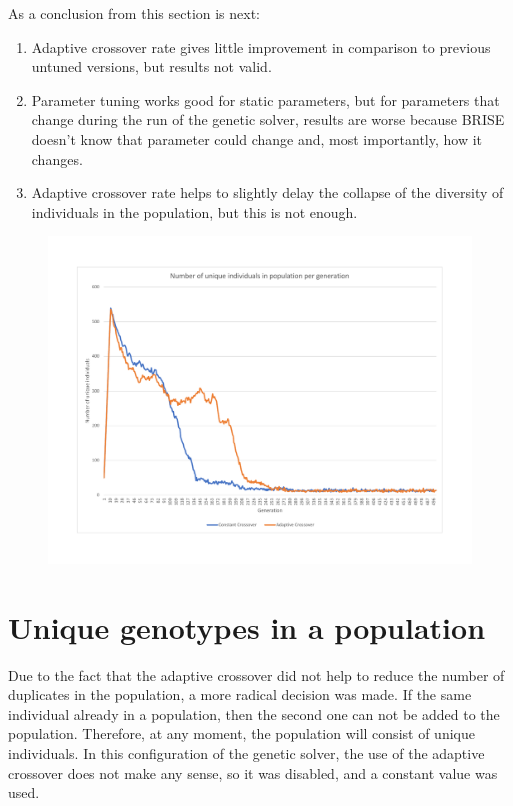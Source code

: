 As a conclusion from this section is next:
\begin{enumerate}
	\item Adaptive crossover rate gives little improvement in comparison to previous untuned versions, but results not valid.
	\item Parameter tuning works good for static parameters, but for parameters that change during the run of the genetic solver, results are worse because BRISE doesn't know that parameter could change and, most importantly, how it changes.
	\item Adaptive crossover rate helps to slightly delay the collapse of the diversity of individuals in the population, but this is not enough.
\end{enumerate} 
\begin{figure}
	\centering
	\includegraphics[width=\textwidth]{images/UniqIndividualsPerGeneration2.pdf}
	\caption[]{}
	\label{fig:UniqIndividualsPerGeneration2}
\end{figure}                        

\section{Unique genotypes in a population}
Due to the fact that the adaptive crossover did not help to reduce the number of duplicates in the population, a more radical decision was made. If the same individual already in a population, then the second one can not be added to the population. Therefore, at any moment, the population will consist of unique individuals. In this configuration of the genetic solver, the use of the adaptive crossover does not make any sense, so it was disabled, and a constant value was used.

